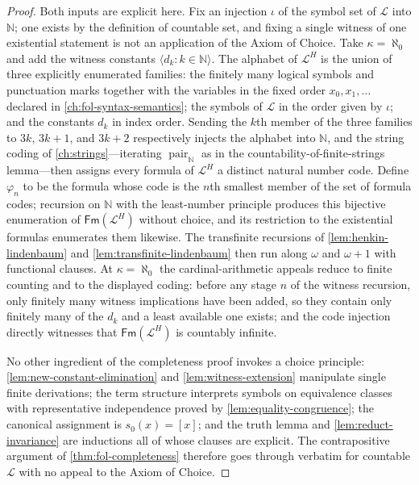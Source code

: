 \documentclass[11pt,oneside,openany]{book}
\theoremstyle{definition}
\theoremstyle{plain}
\theoremstyle{remark}
\newcommand{\N}{\mathbb{N}}
\newcommand{\Lang}{\mathcal{L}}
\newcommand{\Fm}{\mathsf{Fm}}
\begin{document}
\begin{proof}
Both inputs are explicit here.  Fix an injection \(\iota\) of the symbol
set of \(\Lang\) into \(\N\); one exists by the definition of countable
set, and fixing a single witness of one existential statement is not an
application of the Axiom of Choice.  Take \(\kappa=\aleph_0\) and add the
witness constants \(\langle d_k:k\in\N\rangle\).  The alphabet of
\(\Lang^H\) is the union of three explicitly enumerated families: the
finitely many logical symbols and punctuation marks together with the
variables in the fixed order \(x_0,x_1,\ldots\) declared in
\cref{ch:fol-syntax-semantics}; the symbols of \(\Lang\) in the order
given by \(\iota\); and the constants \(d_k\) in index order.  Sending
the \(k\)th member of the three families to \(3k\), \(3k+1\), and
\(3k+2\) respectively injects the alphabet into \(\N\), and the string
coding of \cref{ch:strings}---iterating \(\operatorname{pair}_{\N}\) as
in the countability-of-finite-strings lemma---then assigns every formula
of \(\Lang^H\) a distinct natural number code.  Define \(\varphi_n\) to
be the formula whose code is the \(n\)th smallest member of the set of
formula codes; recursion on \(\N\) with the least-number principle
produces this bijective enumeration of \(\Fm(\Lang^H)\) without choice,
and its restriction to the existential formulas enumerates them likewise.
The transfinite recursions of \cref{lem:henkin-lindenbaum} and
\cref{lem:transfinite-lindenbaum} then run along \(\omega\) and
\(\omega+1\) with functional clauses.  At \(\kappa=\aleph_0\) the
cardinal-arithmetic appeals reduce to finite counting and to the displayed
coding: before any stage \(n\) of the witness recursion, only finitely
many witness implications have been added, so they contain only finitely
many of the \(d_k\) and a least available one exists; and the code
injection directly witnesses that \(\Fm(\Lang^H)\) is countably
infinite.

No other ingredient of the completeness proof invokes a choice principle:
\cref{lem:new-constant-elimination} and
\cref{lem:witness-extension} manipulate single finite derivations; the
term structure interprets symbols on equivalence classes with
representative independence proved by
\cref{lem:equality-congruence}; the canonical assignment is
\(s_0(x)=[x]\); and the truth lemma and
\cref{lem:reduct-invariance} are inductions all of whose clauses are
explicit.  The
contrapositive argument of \cref{thm:fol-completeness} therefore goes
through verbatim for countable \(\Lang\) with no appeal to the Axiom of
Choice.
\end{proof}
\end{document}
